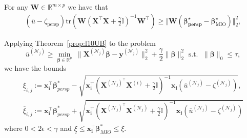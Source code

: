 \documentclass[ijoc,noblindrev]{informs3} %
\newcommand{\ag}[1]{{\color{black}#1}}
\begin{document}
\begin{corollary}
    For any $\bm{W} \in \mathbb{R}^{m \times p}$ we have that
 \begin{align*}
     (\bar{u}-\zeta_{\text{persp}}) \mathrm{tr}\left(\bm{W} \left(\bm{X}^\top \bm{X}+\frac{\gamma}{2} \bm{\mathbb{I}}\right)^{-1} \bm{W}^\top\right)\geq \Vert 
     \bm{W}(\bm{\beta^\star_{\text{persp}}}- \bm{\beta}^\star_{\text{MIO}})\Vert_2^2,
 \end{align*}
\end{corollary}


Applying Theorem~\ref{prop:l10UB} to the problem 
$$	\bar u^{(\mathcal{N}_j)}\geq \min_{\bm{\beta}\in \mathbb{R}^p}\; \|\bm{X}^{(\mathcal{N}_j)}\bm{\beta}-\bm{y}^{(\mathcal{N}_j)}\|_2^2+\frac{\gamma}{2}\|\bm{\beta}\|_2^2
\text{ s.t. }\; \|\bm{\beta}\|_0\leq \tau,$$  we have the bounds
\begin{align*}
	\underline{\xi}_{i,j}:=\bm{x_i^\top}\bm{\beta}_{persp}^*-\sqrt{\bm{x_i^\top}\left(\bm{X}^{(\mathcal{N}_j)^\top} \bm{X}^{(i)}+\frac{\gamma}{2}\mathbb{I}\right)^{-1}\bm{x_i}\left(\bar u^{(\mathcal{N}_j)}-\zeta^{(\mathcal{N}_j)}\right)},\\
	\bar{\xi}_{i,j}:=\bm{x_i^\top}\bm{\beta}_{persp}^*+\sqrt{\bm{x_i^\top}\left(\bm{X}^{(\mathcal{N}_j)^\top} \bm{X}^{(\mathcal{N}_j)}+\frac{\gamma}{2}\mathbb{I}\right)^{-1}\bm{x_i}\left(\bar u^{(\mathcal{N}_j)}-\zeta^{(\mathcal{N}_j)}\right)}
\end{align*}
where $0 < 2\epsilon < \gamma$ and $\underline{\xi}\leq \bm{x_i^\top}\bm{\beta}_{MIO}^*\leq \bar\xi$. %
\end{document}
